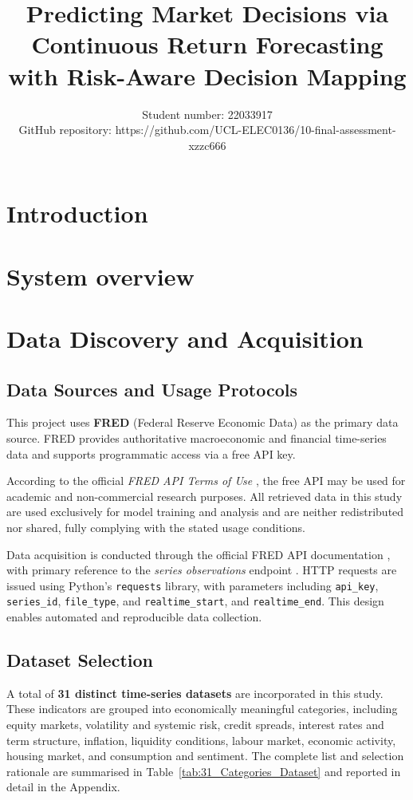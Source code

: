 \documentclass[10pt]{article} %
\title{Predicting Market Decisions via Continuous Return Forecasting with Risk-Aware Decision Mapping}
\author{\name Student number: 22033917 \\
      \addr GitHub repository: https://github.com/UCL-ELEC0136/10-final-assessment-xzzc666
      }
\begin{document}
\maketitle


\section{Introduction}

\section{System overview}

\section{Data Discovery and Acquisition}

\subsection{Data Sources and Usage Protocols}

This project uses \textbf{FRED} (Federal Reserve Economic Data) as the primary data source. 
FRED provides authoritative macroeconomic and financial time-series data and supports programmatic access via a free API key.

According to the official \textit{FRED API Terms of Use} \cite{FRED API Terms of Use}, the free API may be used for academic and non-commercial research purposes. 
All retrieved data in this study are used exclusively for model training and analysis and are neither redistributed nor shared, fully complying with the stated usage conditions.

Data acquisition is conducted through the official FRED API documentation \cite{FRED ALL API}, with primary reference to the \textit{series observations} endpoint \cite{FRED SERIES API}. 
HTTP requests are issued using Python’s \texttt{requests} library, with parameters including \texttt{api\_key}, \texttt{series\_id}, \texttt{file\_type}, and \texttt{realtime\_start}, and \texttt{realtime\_end}. 
This design enables automated and reproducible data collection.

\subsection{Dataset Selection}

A total of \textbf{31 distinct time-series datasets} are incorporated in this study. 
These indicators are grouped into economically meaningful categories, including equity markets, volatility and systemic risk, credit spreads, interest rates and term structure, inflation, liquidity conditions, labour market, economic activity, housing market, and consumption and sentiment. 
The complete list and selection rationale are summarised in Table~\ref{tab:31_Categories_Dataset} and reported in detail in the Appendix.
\end{document}
